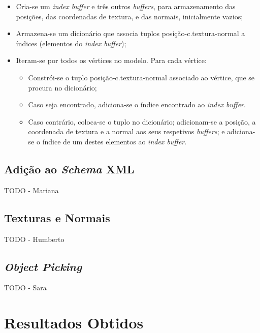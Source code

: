 \documentclass[12pt, a4paper]{article}
\begin{document}
\begin{itemize}
    \item Cria-se um \emph{index buffer} e três outros \emph{buffers}, para armazenamento das
        posições, das coordenadas de textura, e das normais, inicialmente vazios;

    \item Armazena-se um dicionário que associa tuplos posição-c.textura-normal a índices (elementos
        do \emph{index buffer});

    \item Iteram-se por todos os vértices no modelo. Para cada vértice:
        \begin{itemize}
            \item Constrói-se o tuplo posição-c.textura-normal associado ao vértice, que se procura
                no dicionário;
            \item Caso seja encontrado, adiciona-se o índice encontrado ao \emph{index buffer}.
            \item Caso contrário, coloca-se o tuplo no dicionário; adicionam-se a posição, a
                coordenada de textura e a normal aos seus respetivos \emph{buffers}; e adiciona-se o
                índice de um destes elementos ao \emph{index buffer}.
        \end{itemize}
\end{itemize}

\subsection{Adição ao \emph{Schema} XML}

{\color{red} TODO - Mariana}

\subsection{Texturas e Normais}

{\color{red} TODO - Humberto}

\subsection{\emph{Object Picking}}

{\color{red} TODO - Sara}

\section{Resultados Obtidos}
\end{document}
